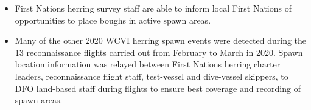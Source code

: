 \begin{itemize}

\item First Nations herring survey staff are able to inform local First Nations of opportunities to place boughs in active spawn areas.

\item Many of the other 2020 WCVI herring spawn events were detected during the 13 reconnaissance flights carried out from February  to March  in 2020.
Spawn location information was relayed between First Nations herring charter leaders, reconnaissance flight staff, test-vessel and dive-vessel skippers, to DFO land-based staff during flights to ensure best coverage and recording of spawn areas.

\end{itemize}